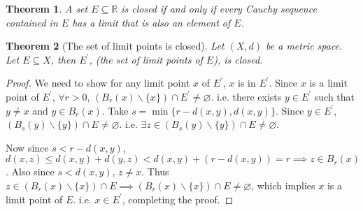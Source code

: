 \documentclass[12pt, lettersize]{book}
\theoremstyle{plain}
\newtheorem{thm}{Theorem}[section]
\theoremstyle{definition}
\theoremstyle{remark}
\newcommand{\R}{\mathbb{R}}
\let\emptyset\varnothing
\begin{document}
		\begin{thm}
			A set $E\subseteq \R$ is closed if and only if every Cauchy sequence contained in $E$ has a limit that is also an element of $E$.
		\end{thm}
		
		\begin{thm}[The set of limit points is closed]
			Let $(X,d)$ be a metric space. Let $E\subseteq X$, then $E^\prime$, (the set of limit points of $E$), is closed.
		\end{thm}
		\begin{proof}
			We need to show for any limit point $x$ of $E^\prime$, $x$ is in $E^\prime$. Since $x$ is a limit point of $E^\prime$, $\forall r>0$, $(B_r(x)\backslash\{x\})\cap E^\prime\neq\emptyset$. i.e. there exists $y\in E^\prime$ such that $y\neq x$ and $y\in B_r(x)$. Take $s=\min\{r-d(x,y), d(x,y)\}$. Since $y\in E^\prime$, $(B_s(y)\backslash\{y\})\cap E\neq\emptyset$. i.e. $\exists z\in(B_s(y)\backslash\{y\})\cap E\neq\emptyset$.\smallskip
			
			Now since $s<r-d(x,y)$, $d(x,z)\leq d(x,y)+d(y,z)<d(x,y)+(r-d(x,y))=r\implies z\in B_r(x)$. Also since $s<d(x,y)$, $z\neq x$. Thus $z\in(B_r(x)\backslash\{x\})\cap E\implies (B_r(x)\backslash\{x\})\cap E\neq\emptyset$, which implies $x$ is a limit point of $E$. i.e. $x\in E^\prime$, completing the proof. 
		\end{proof}
		
\end{document}

